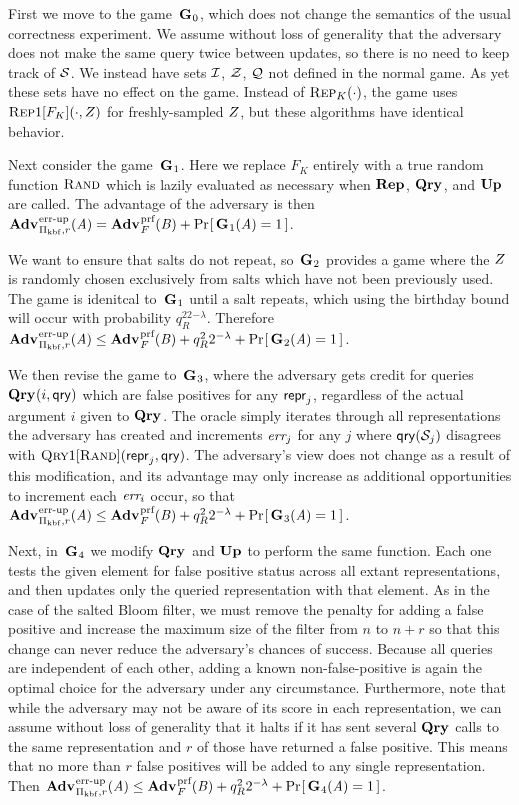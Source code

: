 First we move to the game~$\mathbf{G}\hspace{0.5pt}_0$, which does not change the semantics of the usual correctness experiment. We assume without loss of generality that the adversary does not make the same query twice between updates, so there is no need to keep track of $\mathcal{S}$. We instead have sets $\mathcal{I}$, $\mathcal{Z}$, $\mathcal{Q}$ not defined in the normal game. As yet these sets have no effect on the game. Instead of $\textsc{Rep}_K(\cdot)$, the game uses $\textsc{Rep}1[F_K](\cdot,Z)$ for freshly-sampled $Z$, but these algorithms have identical behavior.

Next consider the game~$\mathbf{G}\hspace{0.5pt}_1$. Here we replace $F_K$ entirely with a true random function $\textsc{Rand}$ which is lazily evaluated as necessary when $\mathbf{Rep}\hspace{0.5pt}$, $\mathbf{Qry}\hspace{0.5pt}$, and $\mathbf{Up}\hspace{0.5pt}$ are called. The advantage of the adversary is then $\Adv{\errep}_{\struct_\prfbloom,r}(\advA) = \Adv{\prf}_F(\advB) + \Prob{\G_1(\advA)=1}$.

We want to ensure that salts do not repeat, so~$\mathbf{G}\hspace{0.5pt}_2$ provides a game where the $Z$ is randomly chosen exclusively from salts which have not been previously used. The game is idenitcal to~$\mathbf{G}\hspace{0.5pt}_1$ until a salt repeats, which using the birthday bound will occur with probability $q_R^22^{-\lambda}$. Therefore $\Adv{\errep}_{\struct_\prfbloom,r}(\advA) \le \Adv{\prf}_F(\advB) + q_R^22^{-\lambda} + \Prob{\G_2(\advA)=1}$.

We then revise the game to~$\mathbf{G}\hspace{0.5pt}_3$, where the adversary gets credit for queries $\mathbf{Qry}\hspace{0.5pt}(i,\mathsf{qry})$ which are false positives for any $\mathsf{repr}_j$, regardless of the actual argument $i$ given to $\mathbf{Qry}\hspace{0.5pt}$. The oracle simply iterates through all representations the adversary has created and increments $\textit{err}_j$ for any $j$ where $\mathsf{qry}(\mathcal{S}_j)$ disagrees with $\textsc{Qry}1[\textsc{Rand}](\mathsf{repr}_j,\mathsf{qry})$. The adversary's view does not change as a result of this modification, and its advantage may only increase as additional opportunities to increment each $\textit{err}_i$ occur, so that $\Adv{\errep}_{\struct_\prfbloom,r}(\advA) \le \Adv{\prf}_F(\advB) + q_R^22^{-\lambda} + \Prob{\G_3(\advA)=1}$.

Next, in~$\mathbf{G}\hspace{0.5pt}_4$ we modify $\mathbf{Qry}\hspace{0.5pt}$ and $\mathbf{Up}\hspace{0.5pt}$ to perform the same function. Each one tests the given element for false positive status across all extant representations, and then updates only the queried representation with that element. As in the case of the salted Bloom filter, we must remove the penalty for adding a false positive and increase the maximum size of the filter from $n$ to $n+r$ so that this change can never reduce the adversary's chances of success.  Because all queries are independent of each other, adding a known non-false-positive is again the optimal choice for the adversary under any circumstance. Furthermore, note that while the adversary may not be aware of its score in each representation, we can assume without loss of generality that it halts if it has sent several $\mathbf{Qry}\hspace{0.5pt}$ calls to the same representation and $r$ of those have returned a false positive. This means that no more than $r$ false positives will be added to any single representation. Then $\Adv{\errep}_{\struct_\prfbloom,r}(\advA) \le \Adv{\prf}_F(\advB) + q_R^22^{-\lambda} + \Prob{\G_4(\advA)=1}$.

